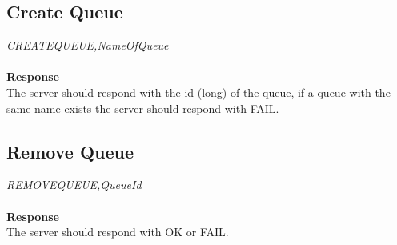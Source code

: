 \documentclass{article}
\begin{document}
            \subsection{Create Queue}
                \indent\indent\textit{CREATEQUEUE,NameOfQueue}\\
                \\
                \textbf{Response}\\
                The server should respond with the id (long) of the queue, if a queue with the same name exists the server should respond with FAIL.

            \subsection{Remove Queue}
                \indent\indent\textit{REMOVEQUEUE,QueueId}\\
                \\
                \textbf{Response}\\
                The server should respond with OK or FAIL.
\end{document}
